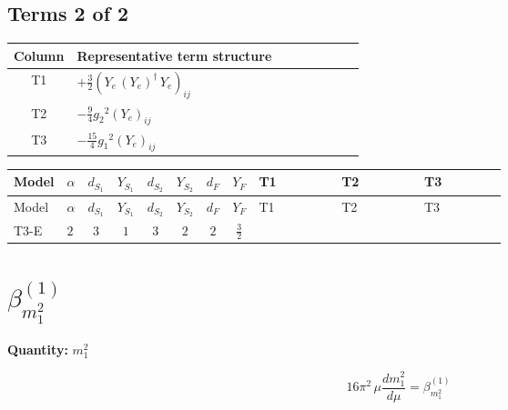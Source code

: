 \documentclass[8pt]{article}
\begin{document}
\begin{landscape}
\subsection*{Terms 2 of 2}
\begin{center}
\begin{tabular}{@{}c >{\raggedright\arraybackslash}p{0.82\linewidth}@{}}
\toprule
Column & Representative term structure \\
\midrule
T1 & \(\displaystyle +\frac{3}{2} \left({Y_e}\,\left({Y_e}\right)^{\dagger}\,{Y_e}\right)_{ij}\) \\
\midrule
T2 & \(\displaystyle -\frac{9}{4} {g_2}^2 \left({Y_e}\right)_{ij}\) \\
\midrule
T3 & \(\displaystyle -\frac{15}{4} {g_1}^2 \left({Y_e}\right)_{ij}\) \\
\midrule
\bottomrule
\end{tabular}
\end{center}
\smallskip
\tiny
\begin{longtable}{@{}llcccccc >{\raggedright\arraybackslash}p{0.21\linewidth} >{\raggedright\arraybackslash}p{0.21\linewidth} >{\raggedright\arraybackslash}p{0.21\linewidth}@{}}
\toprule
Model & $\alpha$ & $d_{S_1}$ & $Y_{S_1}$ & $d_{S_2}$ & $Y_{S_2}$ & $d_F$ & $Y_F$ & T1 & T2 & T3 \\
\midrule
\endfirsthead
\toprule
Model & $\alpha$ & $d_{S_1}$ & $Y_{S_1}$ & $d_{S_2}$ & $Y_{S_2}$ & $d_F$ & $Y_F$ & T1 & T2 & T3 \\
\midrule
\endhead
T3-E & $2$ & $3$ & $1$ & $3$ & $2$ & $2$ & $\frac{3}{2}$ & \scriptsize\adjustbox{max width=\linewidth}{$\begin{gathered} +\frac{3}{2} \left({Y_e}\,\left({Y_e}\right)^{\dagger}\,{Y_e}\right)_{ij}\end{gathered}$} & \scriptsize\adjustbox{max width=\linewidth}{$\begin{gathered} -\frac{9}{4} {g_2}^2 \left({Y_e}\right)_{ij}\end{gathered}$} & \scriptsize\adjustbox{max width=\linewidth}{$\begin{gathered} -\frac{15}{4} {g_1}^2 \left({Y_e}\right)_{ij}\end{gathered}$} \\
\midrule
\bottomrule
\end{longtable}
\clearpage
\section*{$\beta_{m_1^2}^{(1)}$}
\noindent\textbf{Quantity: }$m_1^2$\par\smallskip
\[16\pi^2\,\mu\frac{d m_1^2}{d\mu}=\beta_{m_1^2}^{(1)}\]

\end{landscape}
\end{document}
